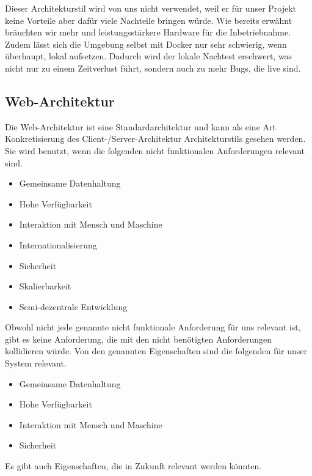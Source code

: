 \vspace{6pt}

Dieser Architekturstil wird von uns nicht verwendet, weil er für unser Projekt keine Vorteile aber dafür viele Nachteile bringen würde. Wie bereits erwähnt bräuchten wir mehr und leistungsstärkere Hardware für die Inbetriebnahme. Zudem lässt sich die Umgebung selbst mit Docker nur sehr schwierig, wenn überhaupt, lokal aufsetzen. Dadurch wird der lokale Nachtest erschwert, was nicht nur zu einem Zeitverlust führt, sondern auch zu mehr Bugs, die live sind. 

\vspace{18pt}

\subsection{Web-Architektur}
Die Web-Architektur ist eine Standardarchitektur und kann als eine Art Konkretisierung des Client-/Server-Architektur Architekturstils gesehen werden. Sie wird benutzt, wenn die folgenden nicht funktionalen Anforderungen relevant sind.

\begin{itemize}
	\item Gemeinsame Datenhaltung
	\item Hohe Verfügbarkeit
	\item Interaktion mit Mensch und Maschine
	\item Internationalisierung 
	\item Sicherheit
	\item Skalierbarkeit
	\item Semi-dezentrale Entwicklung
\end{itemize}

Obwohl nicht jede genannte nicht funktionale Anforderung für uns relevant ist, gibt es keine Anforderung, die mit den nicht benötigten Anforderungen kollidieren würde. Von den genannten Eigenschaften sind die folgenden für unser System relevant.

\begin{itemize}
	\item Gemeinsame Datenhaltung
	\item Hohe Verfügbarkeit
	\item Interaktion mit Mensch und Maschine
	\item Sicherheit
\end{itemize}

Es gibt auch Eigenschaften, die in Zukunft relevant werden könnten.

